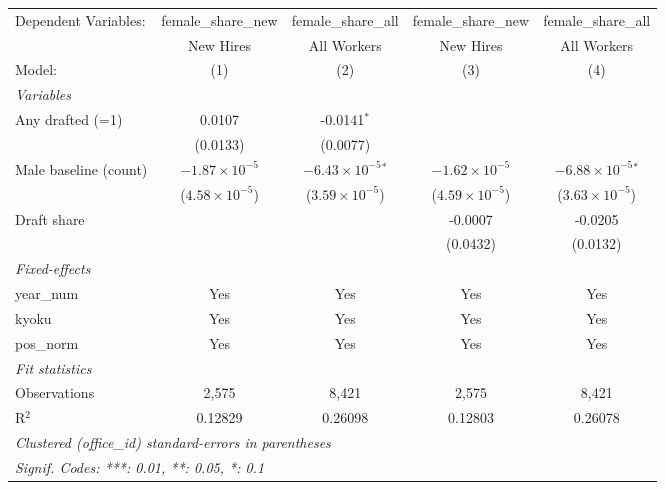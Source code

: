 \begingroup
\centering
\begin{tabular}{lcccc}
   \tabularnewline \midrule \midrule
   Dependent Variables:  & female\_share\_new      & female\_share\_all           & female\_share\_new      & female\_share\_all\\    
                         & New Hires               & All Workers                  & New Hires               & All Workers \\   
   Model:                & (1)                     & (2)                          & (3)                     & (4)\\  
   \midrule
   \emph{Variables}\\
   Any drafted (=1)      & 0.0107                  & -0.0141$^{*}$                &                         &   \\   
                         & (0.0133)                & (0.0077)                     &                         &   \\   
   Male baseline (count) & $-1.87\times 10^{-5}$   & $-6.43\times 10^{-5}$$^{*}$  & $-1.62\times 10^{-5}$   & $-6.88\times 10^{-5}$$^{*}$\\    
                         & ($4.58\times 10^{-5}$)  & ($3.59\times 10^{-5}$)       & ($4.59\times 10^{-5}$)  & ($3.63\times 10^{-5}$)\\    
   Draft share           &                         &                              & -0.0007                 & -0.0205\\   
                         &                         &                              & (0.0432)                & (0.0132)\\   
   \midrule
   \emph{Fixed-effects}\\
   year\_num             & Yes                     & Yes                          & Yes                     & Yes\\  
   kyoku                 & Yes                     & Yes                          & Yes                     & Yes\\  
   pos\_norm             & Yes                     & Yes                          & Yes                     & Yes\\  
   \midrule
   \emph{Fit statistics}\\
   Observations          & 2,575                   & 8,421                        & 2,575                   & 8,421\\  
   R$^2$                 & 0.12829                 & 0.26098                      & 0.12803                 & 0.26078\\  
   \midrule \midrule
   \multicolumn{5}{l}{\emph{Clustered (office\_id) standard-errors in parentheses}}\\
   \multicolumn{5}{l}{\emph{Signif. Codes: ***: 0.01, **: 0.05, *: 0.1}}\\
\end{tabular}
\par\endgroup
